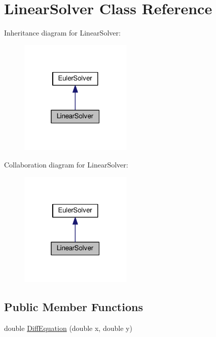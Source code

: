 \hypertarget{classLinearSolver}{}\section{Linear\+Solver Class Reference}
\label{classLinearSolver}


Inheritance diagram for Linear\+Solver\+:
\nopagebreak
\begin{figure}[H]
\begin{center}
\leavevmode
\includegraphics[width=151pt]{classLinearSolver__inherit__graph}
\end{center}
\end{figure}


Collaboration diagram for Linear\+Solver\+:
\nopagebreak
\begin{figure}[H]
\begin{center}
\leavevmode
\includegraphics[width=151pt]{classLinearSolver__coll__graph}
\end{center}
\end{figure}
\subsection*{Public Member Functions}
\begin{DoxyCompactItemize}
\item 
double \hyperlink{classLinearSolver_a182b863c81de60909a8ca74433a26a14}{Diff\+Equation} (double x, double y)
\end{DoxyCompactItemize}
